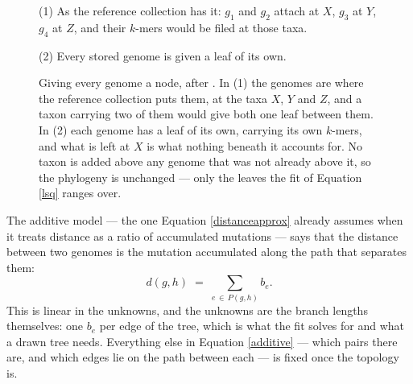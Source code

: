 \documentclass[pdflatex,sn-vancouver-num]{sn-jnl}
\begin{document}
\begin{figure}[!htbp]
    \centering
    \small
    \begin{minipage}[c]{0.30\textwidth}
    \begin{flushleft}(1) As the reference collection has it: $g_1$ and $g_2$ attach at $X$,
    $g_3$ at $Y$, $g_4$ at $Z$, and their $k$-mers would be filed at those
    taxa.\end{flushleft}
    \end{minipage}
    \begin{minipage}[c]{0.20\textwidth}
    \end{minipage}
    \begin{minipage}[c]{0.26\textwidth}
    \end{minipage}
    \begin{minipage}[c]{0.20\textwidth}
    \begin{flushleft}(2) Every stored genome is given a leaf of its own.\end{flushleft}
    \end{minipage}
    \caption{Giving every genome a node, after \citet{genestrip-ft}. In (1) the genomes are where the
    reference collection puts them, at the taxa $X$, $Y$ and $Z$, and a taxon carrying two of them
    would give both one leaf between them. In (2) each genome has a leaf of its own, carrying its own
    $k$-mers, and what is left at $X$ is what nothing beneath it accounts for. No taxon is added above
    any genome that was not already above it, so the phylogeny is unchanged --- only the leaves the
    fit of Equation \eqref{lsq} ranges over.\protect\footnotemark}\label{genomenodes}
\end{figure}
The additive model --- the one Equation \eqref{distanceapprox} already assumes when it treats
distance as a ratio of accumulated mutations --- says that the distance between two genomes is the
mutation accumulated along the path that separates them:
%
\begin{equation}
  d(g,h) \;=\; \sum_{e \,\in\, P(g,h)} b_e .
  \label{additive}
\end{equation}
%
This is linear in the unknowns, and the unknowns are the branch lengths themselves: one $b_e$ per edge
of the tree, which is what the fit solves for and what a drawn tree needs. Everything else in
Equation \eqref{additive} --- which pairs there are, and which edges lie on the path between each ---
is fixed once the topology is.
\end{document}

